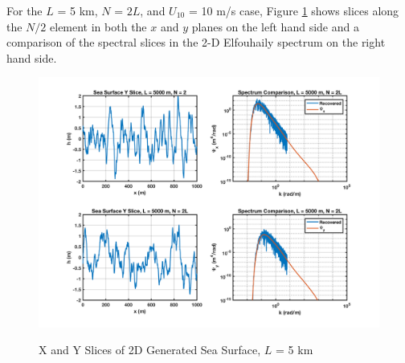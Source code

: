 For the $L$ = 5 km, $N$ = $2L$, and $U_{10}$ = 10 m/s case, Figure \ref{os_fig:11a} shows slices along the $N/2$ element in both the $x$ and $y$ planes on the left hand side and a comparison of the spectral slices in the 2-D Elfouhaily spectrum on the right hand side.
\begin{figure}[H]
  \begin{center}
\includegraphics[width=6in]{../media/Ocean_Surface/sea_surface_2d_slices_5000.png}
  \end{center}
  \renewcommand{\baselinestretch}{1} \small\normalsize
  \begin{quote}
    \caption[X and Y Slices of 2D Generated Sea Surface, $L$ = 5 km]{X and Y Slices of 2D Generated Sea Surface, $L$ = 5 km\label{os_fig:11a}}
  \end{quote}
\end{figure}
\renewcommand{\baselinestretch}{2} \small\normalsize
 
